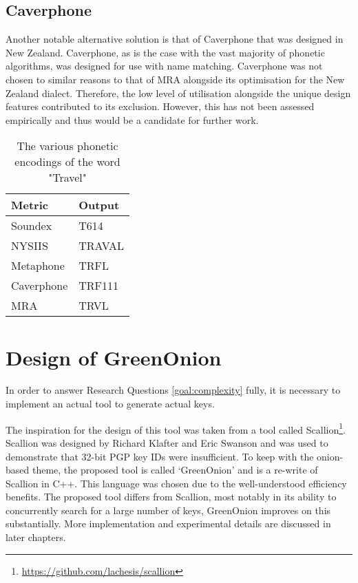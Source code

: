 \subsection{Caverphone}
Another notable alternative solution is that of Caverphone that was designed in New Zealand. Caverphone, as is the case with the vast majority of phonetic algorithms, was designed for use with name matching. Caverphone was not chosen to similar reasons to that of MRA alongside its optimisation for the New Zealand dialect. Therefore, the low level of utilisation alongside the unique design features contributed to its exclusion. However, this has not been assessed empirically and thus would be a candidate for further work.

\begin{table}[h!]
    \centering
    \begin{tabular}{ll}
        Metric & Output \\
        \hline    
        Soundex & T614 \\
        NYSIIS & TRAVAL\\
        Metaphone & TRFL\\
        Caverphone & TRF111\\
        MRA & TRVL
    \end{tabular}
    \caption{The various phonetic encodings of the word "Travel"}
\end{table}

\section{Design of GreenOnion}
\label{sec:greenDesign}
In order to answer Research Questions \ref{goal:complexity} fully, it is necessary to implement an actual tool to generate actual keys. 

The inspiration for the design of this tool was taken from a tool called Scallion\footnote{\url{https://github.com/lachesis/scallion}}. Scallion was designed by Richard Klafter and Eric Swanson and was used to demonstrate that 32-bit PGP key IDs were insufficient. To keep with the onion-based theme, the proposed tool is called `GreenOnion' and is a re-write of Scallion in C++. This language was chosen due to the well-understood efficiency benefits. The proposed tool differs from Scallion, most notably in its ability to concurrently search for a large number of keys, GreenOnion improves on this substantially. More implementation and experimental details are discussed in later chapters.


